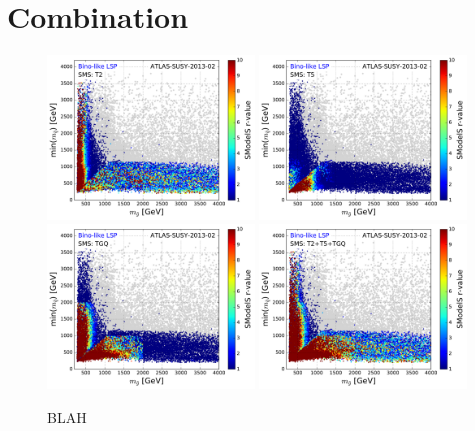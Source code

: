 \documentclass[a4paper,10pt]{article}
\begin{document}
\section{Combination}
\begin{figure}[!]
\begin{center}
\subfigure
{\includegraphics[width=0.49\textwidth]{PLOTS/Combination/ATLAS-SUSY-2013-02_Bino_SMS_T2_Glu_Squ.pdf}}
\subfigure
{\includegraphics[width=0.49\textwidth]{PLOTS/Combination/ATLAS-SUSY-2013-02_Bino_SMS_T5_Glu_Squ.pdf}}
\subfigure
{\includegraphics[width=0.49\textwidth]{PLOTS/Combination/ATLAS-SUSY-2013-02_Bino_SMS_TGQ_Glu_Squ.pdf}}
\subfigure
{\includegraphics[width=0.49\textwidth]{PLOTS/Combination/ATLAS-SUSY-2013-02_Bino_SMS_T2+T5+TGQ_Glu_Squ.pdf}}
\end{center}
\caption{BLAH} 
\end{figure}
\end{document}
